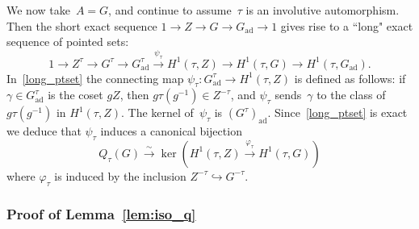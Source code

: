 \documentclass[10pt,leqno]{article}
\numberwithin{equation}{section}
\newcommand{\ad}{\mathrm{ad}}
\newcommand{\Gad}{G_\mathrm{ad}}
\begin{document}
We now take~$A=G$, and continue to assume~$\tau$ is an involutive automorphism. Then the short exact sequence $1\rightarrow Z \rightarrow G \rightarrow \Gad\rightarrow 1$ 
gives rise to a ``long" exact sequence of pointed sets:
\begin{equation} \label{long_ptset}
1\rightarrow Z^\tau \rightarrow G^\tau \rightarrow \Gad^{\tau} \overset{\psi_\tau}{\longrightarrow} H^1(\tau,Z)\to H^1(\tau,G)\rightarrow H^1(\tau,\Gad).
\end{equation}
In~\eqref{long_ptset} the connecting map  $ \psi_\tau\colon \Gad^{\tau} \rightarrow H^1(\tau,Z)$ is defined as follows: if $\gamma \in \Gad^{\tau}$ is the coset $gZ$, then $g\tau(g^{-1}) \in Z^{-\tau}$, and $\psi_\tau$ sends~$\gamma$ to the class of $g \tau(g^{-1})$ in $H^1(\tau, Z)$. The kernel of~$\psi_\tau$ is $(G^\tau)_{\ad}$. Since~\eqref{long_ptset} is exact we deduce that $\psi_\tau$ induces a canonical  bijection
\begin{equation} \label{interp_q_cohomology} Q_{\tau}(G) \overset{\sim}{\longrightarrow}  \ker\left(H^1(\tau,Z)\overset{\varphi_\tau}{\longrightarrow} H^1(\tau,G)\right)\end{equation}
where $\varphi_\tau$ is induced by the inclusion $Z^{-\tau} \hookrightarrow G^{-\tau}$. 


 

\subsubsection{Proof of Lemma~\ref{lem:iso_q}}
\end{document}
